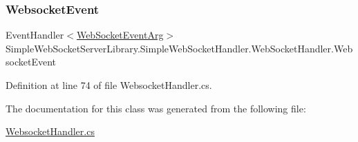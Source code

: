\subsubsection{\texorpdfstring{Websocket\+Event}{WebsocketEvent}}
{\footnotesize\ttfamily Event\+Handler$<$\mbox{\hyperlink{class_simple_web_socket_server_library_1_1_web_socket_event_arg}{Web\+Socket\+Event\+Arg}}$>$ Simple\+Web\+Socket\+Server\+Library.\+Simple\+Web\+Socket\+Handler.\+Web\+Socket\+Handler.\+Websocket\+Event}



Definition at line 74 of file Websocket\+Handler.\+cs.



The documentation for this class was generated from the following file\+:\begin{DoxyCompactItemize}
\item 
\mbox{\hyperlink{_websocket_handler_8cs}{Websocket\+Handler.\+cs}}\end{DoxyCompactItemize}
